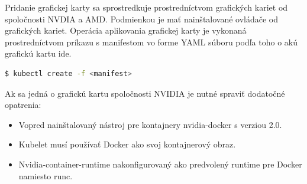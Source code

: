 Pridanie grafickej karty sa sprostredkuje prostredníctvom grafických kariet od spoločnosti NVDIA a AMD. Podmienkou je mať nainštalované ovládače od grafických kariet.
Operácia aplikovania grafickej karty je vykonaná prostredníctvom príkazu s manifestom vo forme YAML súboru podľa toho o akú grafickú kartu ide.

\begin{lstlisting}[language=Bash]
    $ kubectl create -f <manifest>
    \end{lstlisting}

Ak sa jedná o grafickú kartu spoločnosti NVIDIA je nutné spraviť dodatočné opatrenia:

\begin{itemize}
    \item Vopred nainštalovaný nástroj pre kontajnery nvidia-docker s verziou 2.0.
    \item Kubelet musí používať Docker ako svoj kontajnerový obraz.
    \item Nvidia-container-runtime nakonfigurovaný ako predvolený runtime pre Docker namiesto runc.
\end{itemize}
